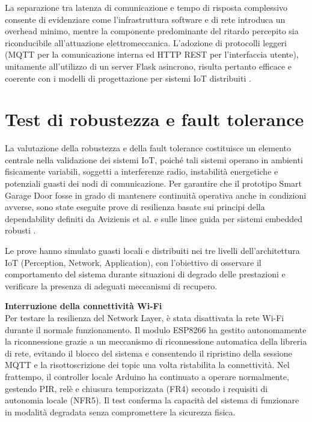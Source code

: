 La separazione tra latenza di comunicazione e tempo di risposta complessivo consente di evidenziare come l’infrastruttura software e di rete introduca un overhead minimo, mentre la componente predominante del ritardo percepito sia riconducibile all’attuazione elettromeccanica. L’adozione di protocolli leggeri (MQTT per la comunicazione interna ed HTTP REST per l’interfaccia utente), unitamente all’utilizzo di un server Flask asincrono, risulta pertanto efficace e coerente con i modelli di progettazione per sistemi IoT distribuiti \cite{Yoon2020, Amaral2018}.


\section{Test di robustezza e fault tolerance}
La valutazione della robustezza e della fault tolerance costituisce un elemento centrale nella validazione dei sistemi IoT, poiché tali sistemi operano in ambienti fisicamente variabili, soggetti a interferenze radio, instabilità energetiche e potenziali guasti dei nodi di comunicazione. Per garantire che il prototipo Smart Garage Door fosse in grado di mantenere continuità operativa anche in condizioni avverse, sono state eseguite prove di resilienza basate sui principi della dependability definiti da Avizienis et al. \cite{Avizienis2004} e sulle linee guida per sistemi embedded robusti \cite{Marwedel2021, Chung2020}.

Le prove hanno simulato guasti locali e distribuiti nei tre livelli dell'architettura IoT (Perception, Network, Application), con l'obiettivo di osservare il comportamento del sistema durante situazioni di degrado delle prestazioni e verificare la presenza di adeguati meccanismi di recupero.

\textbf{Interruzione della connettività Wi-Fi} \\
Per testare la resilienza del Network Layer, è stata disattivata la rete Wi-Fi durante il normale funzionamento. Il modulo ESP8266 ha gestito autonomamente la riconnessione grazie a un
meccanismo di riconnessione automatica della libreria di rete, evitando
il blocco del sistema e consentendo il ripristino della sessione MQTT
e la risottoscrizione dei topic una volta ristabilita la connettività.
Nel frattempo, il controller locale Arduino ha continuato a operare normalmente, gestendo PIR, relè e chiusura temporizzata (FR4) secondo i requisiti di autonomia locale (NFR5). Il test conferma la capacità del sistema di funzionare in modalità degradata senza compromettere la sicurezza fisica.

